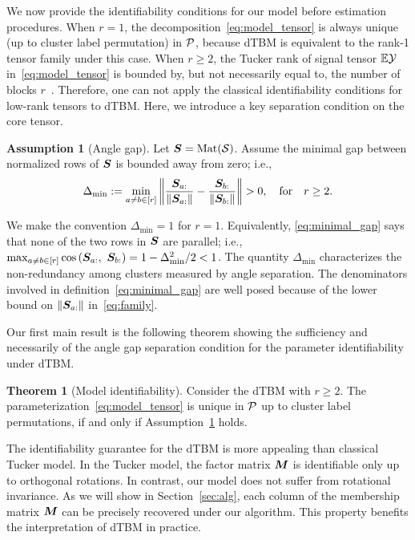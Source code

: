 \documentclass[lettersize,onecolumn,journal]{IEEEtran}
\theoremstyle{definition}
\newtheorem{thm}{Theorem}
\theoremstyle{definition}
\newtheorem{assumption}{Assumption}
\newcommand{\of}[1]{\left(#1\right)}
\begin{document}
We now provide the identifiability conditions for our model before estimation procedures. When $r=1$, the decomposition~\eqref{eq:model_tensor} is always unique (up to cluster label permutation) in $\mathcal{P}$, because dTBM is equivalent to the rank-1 tensor family under this case. When $r\geq 2$, the Tucker rank of signal tensor $\mathbb{E}\mathcal{Y}$ in~\eqref{eq:model_tensor} is bounded by, but not necessarily equal to, the number of blocks $r$~\citep{wang2019multiway}. Therefore, one can not apply the classical identifiability conditions for low-rank tensors to dTBM. Here, we introduce a key separation condition on the core tensor. 

\begin{assumption}[Angle gap] \label{assmp:min_gap}Let $\bm S = \text{Mat}(\mathcal{S})$. Assume the minimal gap between normalized rows of $\bm S$ is bounded away from zero; i.e.,
\begin{equation}\label{eq:minimal_gap}
    \Delta_{\min} := \min_{a \neq b \in [r]} \onorm{\frac{\mS_{a:}}{\onormSize{}{ \mS_{a:}}} - \frac{\mS_{b:}}{\onormSize{}{ \mS_{b:}}} }>0, \quad \text{for} \quad r \geq 2.
\end{equation}
\end{assumption}
We make the convention $\Delta_{\min} = 1$ for $r = 1$. Equivalently, \eqref{eq:minimal_gap} says that none of the two rows in $\bm S$ are parallel; i.e., $\max_{a \neq b\in [r]}\cos \of{\mS_{a:},\  \mS_{b:}}  = 1-\Delta^2_{\min}/2<1$. The quantity $\Delta_{\min}$ characterizes the non-redundancy among clusters measured by angle separation. The denominators involved in definition~\eqref{eq:minimal_gap} are well posed because of the lower bound on $\left\lVert\bm S_{a:}\right\rVert$ in~\eqref{eq:family}. 

Our first main result is the following theorem showing the sufficiency and necessarily of the angle gap separation condition for the parameter identifiability under dTBM. 

\begin{thm}[Model identifiability]\label{thm:unique} Consider the dTBM with $r\geq 2$. The parameterization~\eqref{eq:model_tensor} is unique in $\mathcal{P}$ up to cluster label permutations, if and only if Assumption~\ref{assmp:min_gap} holds.
\end{thm}

The identifiability guarantee for the dTBM is more appealing than classical Tucker model. In the Tucker model, the factor matrix $\bm M$ is identifiable only up to orthogonal rotations. In contrast, our model does not suffer from rotational invariance. As we will show in Section~\ref{sec:alg}, each column of the membership matrix $\bm M$ can be precisely recovered under our algorithm. This property benefits the interpretation of dTBM in practice. 
\end{document}
